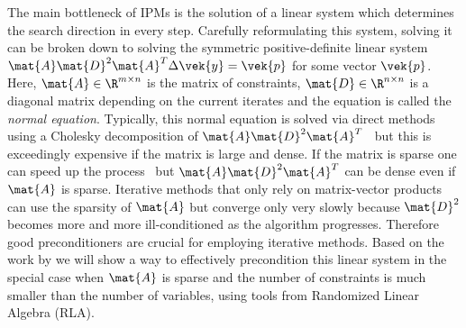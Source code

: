 The main bottleneck of IPMs is the solution of a linear system which determines the search direction in every step.
Carefully reformulating this system, solving it can be broken down to solving the symmetric positive-definite linear system \(\mat{A} \mat{D}^2 \mat{A}^T \Delta \vek{y} = \vek{p}\) for some vector \(\vek{p}\).
Here, \(\mat{A} \in \R^{m \times n}\) is the matrix of constraints, \(\mat{D} \in \R^{n \times n}\) is a diagonal matrix depending on the current iterates and the equation is called the \emph{normal equation}.
Typically, this normal equation is solved via direct methods using a Cholesky decomposition of \(\mat{A} \mat{D}^2 \mat{A}^T\)~\cite[p. 17]{Wright-PrimalDualInteriorPointMethods} but this is exceedingly expensive if the matrix is large and dense.
If the matrix is sparse one can speed up the process~\cite{NgPeyton-SparseCholesky} but \(\mat{A} \mat{D}^2 \mat{A}^T\) can be dense even if \(\mat{A}\) is sparse.
Iterative methods that only rely on matrix-vector products can use the sparsity of \(\mat{A}\) but converge only very slowly because \(\mat{D}^2\) becomes more and more ill-conditioned as the algorithm progresses.
Therefore good preconditioners are crucial for employing iterative methods.
Based on the work by \textcite{Avron-FasterRandomizedInfeasibleIPMs} we will show a way to effectively precondition this linear system in the special case when \(\mat{A}\) is sparse and the number of constraints is much smaller than the number of variables, using tools from Randomized Linear Algebra (RLA).

